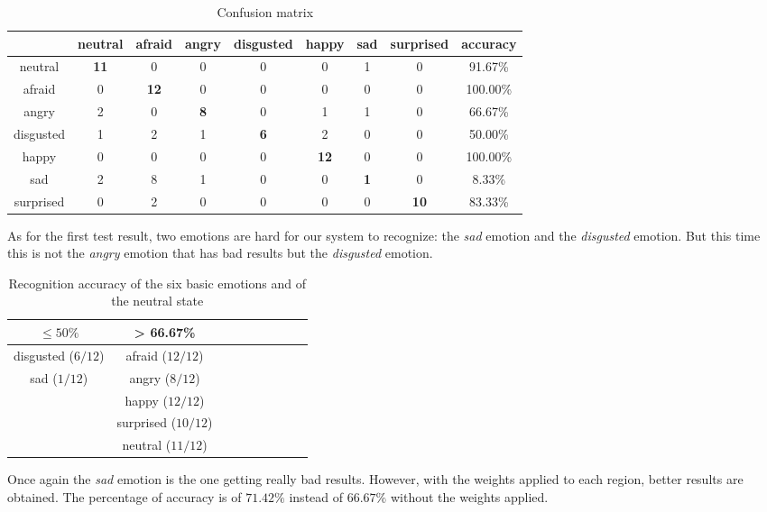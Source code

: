 \begin{table}[h]
\begin{center}
   \caption{\label{table_results_confusion_matrix} Confusion matrix}
\begin{tabular}{|c|c|c|c|c|c|c|c|c|}
  \hline
   & neutral & afraid & angry & disgusted & happy & sad & surprised & accuracy \\
  \hline
  neutral & \textbf{11} & 0 & 0 & 0 & 0 & 1 & 0 & 91.67\% \\
  afraid & 0 & \textbf{12} & 0 & 0 & 0 & 0 & 0 & 100.00\% \\
  angry & 2 & 0 & \textbf{8} & 0 & 1 & 1 & 0 & 66.67\% \\
  disgusted & 1 & 2 & 1 & \textbf{6} & 2 & 0 & 0 & 50.00\% \\
  happy & 0 & 0 & 0 & 0 & \textbf{12} & 0 & 0 & 100.00\% \\
  sad & 2 & 8 & 1 & 0 & 0 & \textbf{1} & 0 & 8.33\% \\
  surprised & 0 & 2 & 0 & 0 & 0 & 0 & \textbf{10} & 83.33\%\\
  \hline
\end{tabular}
\end{center}
\end{table}

\noindent As for the first test result, two emotions are hard for our system to recognize: the \textit{sad} emotion and the \textit{disgusted} emotion. But this time this is not the \textit{angry} emotion that has bad results but the \textit{disgusted} emotion.
\newline

\begin{table}[h]
\begin{center}
   \caption{\label{table_results_accuracy} Recognition accuracy of the six basic emotions and of the neutral state}
\begin{tabular}{|c|c|c|c|c|c|c|c|c|}
  \hline
   $ \leq 50\% $ & > 66.67\% \\
  \hline
  disgusted ($ 6/12 $) & afraid ($ 12/12 $) \\
  sad ($ 1/12 $) & angry ($ 8/12 $) \\
   & happy ($ 12/12 $) \\
   & surprised ($ 10/12 $) \\
   & neutral ($ 11/12 $) \\
  \hline
\end{tabular}
\end{center} 
\end{table}

\noindent Once again the \textit{sad} emotion is the one getting really bad results. However, with the weights applied to each region, better results are obtained. The percentage of accuracy is of $71.42\%$ instead of $66.67\%$ without the weights applied.
\newline
